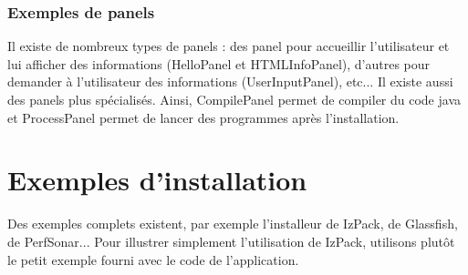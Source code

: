 \subsubsection{Exemples de panels}
Il existe de nombreux types de panels : des panel pour accueillir l'utilisateur et lui afficher des informations (HelloPanel et HTMLInfoPanel), d'autres pour demander à l'utilisateur des informations (UserInputPanel), etc...
Il existe aussi des panels plus spécialisés. Ainsi, CompilePanel permet de compiler du code java et ProcessPanel permet de lancer des programmes après l'installation.

\section{Exemples d'installation}
Des exemples complets existent, par exemple l'installeur de IzPack, de Glassfish, de PerfSonar... 
Pour illustrer simplement l'utilisation de IzPack, utilisons plutôt le petit exemple fourni avec le code de l'application.
